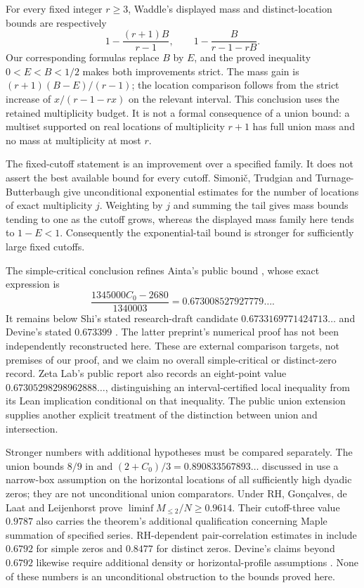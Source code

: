 For every fixed integer $r\ge3$, Waddle's displayed mass and
distinct-location bounds are respectively
\[
 1-\frac{(r+1)B}{r-1},\qquad
 1-\frac{B}{r-1-rB}.
\]
Our corresponding formulas replace $B$ by $E$, and the proved
inequality $0<E<B<1/2$ makes both improvements strict. The mass
gain is $(r+1)(B-E)/(r-1)$; the location comparison follows from
the strict increase of $x/(r-1-rx)$ on the relevant interval.
This conclusion uses the retained multiplicity budget. It is not a
formal consequence of a union bound: a multiset supported on real
locations of multiplicity $r+1$ has full union mass and no mass at
multiplicity at most $r$.

The fixed-cutoff statement is an improvement over a specified family.
It does not assert the best available bound for every cutoff.
Simoni\v{c}, Trudgian and Turnage-Butterbaugh \cite[Theorems 4 and 7]{STT}
give unconditional exponential estimates for the number of locations
of exact multiplicity $j$. Weighting by $j$ and summing the tail gives
mass bounds tending to one as the cutoff grows, whereas the displayed
mass family here tends to $1-E<1$. Consequently the exponential-tail
bound is stronger for sufficiently large fixed cutoffs.

The simple-critical conclusion refines Ainta's public bound
\cite{Ainta}, whose exact expression is
\[
 \frac{1345000C_0-2680}{1340003}
       =0.673008527927779\ldots.
\]
It remains below Shi's stated research-draft candidate
$0.6733169771424713\ldots$ \cite{Shi} and Devine's stated
$0.673399$ \cite{Devine}. The latter preprint's numerical proof has
not been independently reconstructed here. These are external
comparison targets, not premises of our proof, and we claim no overall
simple-critical or distinct-zero record. Zeta Lab's public report
\cite{ZetaLab} also records an eight-point value
$0.67305298298962888\ldots$, distinguishing an interval-certified
local inequality from its Lean implication conditional on that
inequality. The public union extension \cite{Union} supplies another
explicit treatment of the distinction between union and intersection.

Stronger numbers with additional hypotheses must be compared separately.
The union bounds $8/9$ in \cite[Remark 2]{BGSTI} and
$(2+C_0)/3=0.890833567893\ldots$ discussed in \cite[Remark 1.2]{Lamzouri}
use a narrow-box assumption on the horizontal locations of all
sufficiently high dyadic zeros; they are not unconditional union
comparators. Under RH, Gon\c{c}alves, de Laat and Leijenhorst
\cite[Theorem 1]{GdLL} prove
$\liminf M_{\le2}/N\ge0.9614$. Their cutoff-three value $0.9787$
also carries the theorem's additional qualification concerning Maple
summation of specified series. RH-dependent pair-correlation estimates
in \cite{CGdL} include $0.6792$ for simple zeros and $0.8477$ for
distinct zeros. Devine's claims beyond $0.6792$ likewise require
additional density or horizontal-profile assumptions \cite{Devine}.
None of these numbers is an unconditional obstruction to the bounds
proved here.


